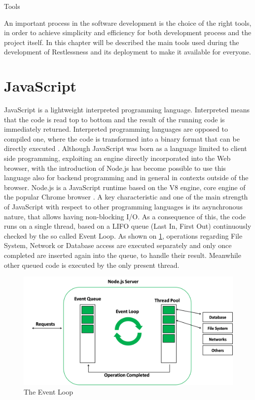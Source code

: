 \begin{chapter}{Tools}

    An important process in the software development is the choice of the right
    tools, in order to achieve simplicity and efficiency for both development
    process and the project itself.
    In this chapter will be described the main tools used during the development
    of Restlessness and its deployment to make it available for everyone.

    \section{JavaScript}
    JavaScript is a lightweight interpreted programming language. Interpreted means
    that the code is read top to bottom and the result of the running code is
    immediately returned. Interpreted programming languages are opposed to compiled
    one, where the code is transformed into a binary format that can be directly
    executed \cite{what_is_js}.
    Although JavaScript was born as a language limited to client side programming,
    exploiting an engine directly incorporated into the Web browser, with the
    introduction of Node.js has become possible to use this language also for backend
    programming and in general in contexts outside of the browser.
    Node.js is a JavaScript runtime based on the V8 engine, core engine of the popular
    Chrome browser \cite{node_org}.
    A key characteristic and one of the main strength of JavaScript with respect
    to other programming languages is its asynchronous nature, that allows having
    non-blocking I/O. As a consequence of this, the code runs on a single thread,
    based on a LIFO queue (Last In, First Out) continuously checked by the so called
    Event Loop.
    As shown on \ref{fig:event_loop}, operations regarding File System, Network or
    Database access are executed separately and only once completed are inserted
    again into the queue, to handle their result. Meanwhile other queued code
    is executed by the only present thread.

    \begin{figure}
        \centering
        \includegraphics[width=\linewidth]{source/images/nodejs_event_loop.png}
        \caption{The Event Loop \cite{node_event_loop_2}}
        \label{fig:event_loop}
    \end{figure}


\end{chapter}
